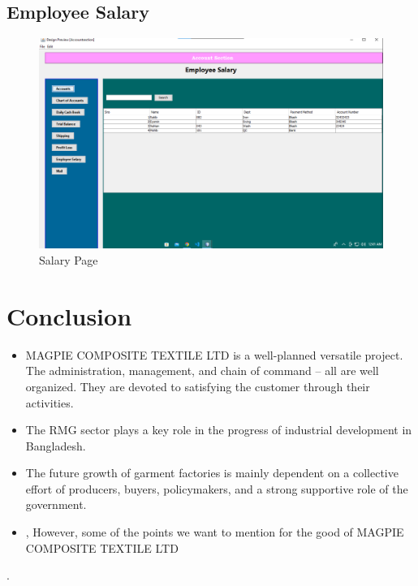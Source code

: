 \documentclass{article}
\begin{document}
\subsection{Employee Salary}
\begin{figure}[h]
    \centering
    \includegraphics[width=13cm]{ui/selary.png}
    \caption{Salary Page}
    \label{fig:my_label}
\end{figure}

\newpage
\section{Conclusion}
\begin{itemize}
    \item MAGPIE COMPOSITE TEXTILE LTD  is a well-planned versatile project. The administration, management, and chain of command – all are well organized. They are devoted to satisfying the customer through their activities.  
\item The RMG sector plays a key role in the progress of industrial development in Bangladesh.
\item The future growth of  garment factories is mainly  dependent on a collective effort of producers, buyers, policymakers, and a strong  supportive role of the government.
\item, However, some of the points we want to mention for the good of MAGPIE COMPOSITE TEXTILE LTD
\end{itemize}
.
\end{document}
